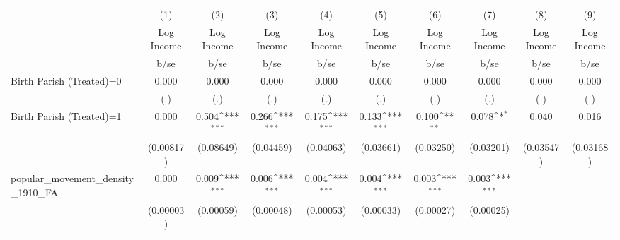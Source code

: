 {
\def\sym#1{\ifmmode^{#1}\else\(^{#1}\)\fi}
\begin{tabular}{l*{9}{c}}
\hline\hline
                    &\multicolumn{1}{c}{(1)}&\multicolumn{1}{c}{(2)}&\multicolumn{1}{c}{(3)}&\multicolumn{1}{c}{(4)}&\multicolumn{1}{c}{(5)}&\multicolumn{1}{c}{(6)}&\multicolumn{1}{c}{(7)}&\multicolumn{1}{c}{(8)}&\multicolumn{1}{c}{(9)}\\
                    &\multicolumn{1}{c}{Log Income}&\multicolumn{1}{c}{Log Income}&\multicolumn{1}{c}{Log Income}&\multicolumn{1}{c}{Log Income}&\multicolumn{1}{c}{Log Income}&\multicolumn{1}{c}{Log Income}&\multicolumn{1}{c}{Log Income}&\multicolumn{1}{c}{Log Income}&\multicolumn{1}{c}{Log Income}\\
                    &        b/se         &        b/se         &        b/se         &        b/se         &        b/se         &        b/se         &        b/se         &        b/se         &        b/se         \\
\hline
Birth Parish (Treated)=0&       0.000         &       0.000         &       0.000         &       0.000         &       0.000         &       0.000         &       0.000         &       0.000         &       0.000         \\
                    &         (.)         &         (.)         &         (.)         &         (.)         &         (.)         &         (.)         &         (.)         &         (.)         &         (.)         \\
Birth Parish (Treated)=1&       0.000         &       0.504\sym{***}&       0.266\sym{***}&       0.175\sym{***}&       0.133\sym{***}&       0.100\sym{**} &       0.078\sym{*}  &       0.040         &       0.016         \\
                    &   (0.00817)         &   (0.08649)         &   (0.04459)         &   (0.04063)         &   (0.03661)         &   (0.03250)         &   (0.03201)         &   (0.03547)         &   (0.03168)         \\
popular\_movement\_density\_1910\_FA&       0.000         &       0.009\sym{***}&       0.006\sym{***}&       0.004\sym{***}&       0.004\sym{***}&       0.003\sym{***}&       0.003\sym{***}&                     &                     \\
                    &   (0.00003)         &   (0.00059)         &   (0.00048)         &   (0.00053)         &   (0.00033)         &   (0.00027)         &   (0.00025)         &                     &                     \\

\end{tabular}}
